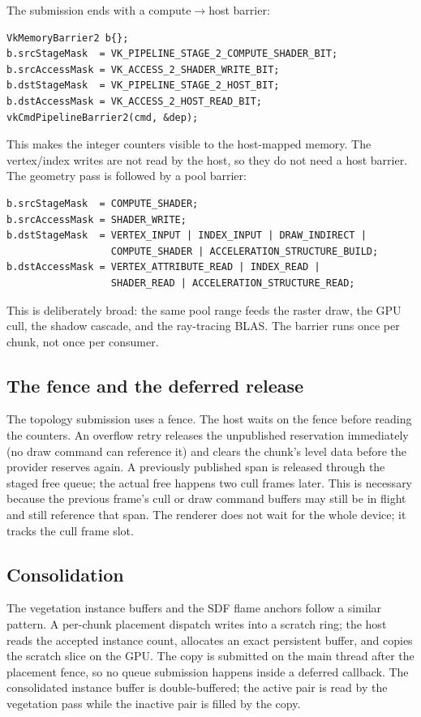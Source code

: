 The submission ends with a compute$\rightarrow$host barrier:
\begin{lstlisting}[style=glsl,caption={Counter readback barrier.},label={lst:hostbarrier}]
VkMemoryBarrier2 b{};
b.srcStageMask  = VK_PIPELINE_STAGE_2_COMPUTE_SHADER_BIT;
b.srcAccessMask = VK_ACCESS_2_SHADER_WRITE_BIT;
b.dstStageMask  = VK_PIPELINE_STAGE_2_HOST_BIT;
b.dstAccessMask = VK_ACCESS_2_HOST_READ_BIT;
vkCmdPipelineBarrier2(cmd, &dep);
\end{lstlisting}
This makes the integer counters visible to the host-mapped memory.  The
vertex/index writes are not read by the host, so they do not need a host
barrier.  The geometry pass is followed by a pool barrier:
\begin{lstlisting}[style=glsl,caption={Pool visibility barrier.},label={lst:poolbarrier}]
b.srcStageMask  = COMPUTE_SHADER;
b.srcAccessMask = SHADER_WRITE;
b.dstStageMask  = VERTEX_INPUT | INDEX_INPUT | DRAW_INDIRECT |
                  COMPUTE_SHADER | ACCELERATION_STRUCTURE_BUILD;
b.dstAccessMask = VERTEX_ATTRIBUTE_READ | INDEX_READ |
                  SHADER_READ | ACCELERATION_STRUCTURE_READ;
\end{lstlisting}
This is deliberately broad: the same pool range feeds the raster draw, the
GPU cull, the shadow cascade, and the ray-tracing BLAS.  The barrier runs
once per chunk, not once per consumer.

\subsection{The fence and the deferred release}

The topology submission uses a fence.  The host waits on the fence before
reading the counters.  An overflow retry releases the unpublished
reservation immediately (no draw command can reference it) and clears the
chunk's level data before the provider reserves again.  A previously
published span is released through the staged free queue; the actual free
happens two cull frames later.  This is necessary because the previous
frame's cull or draw command buffers may still be in flight and still
reference that span.  The renderer does not wait for the whole device; it
tracks the cull frame slot.

\subsection{Consolidation}

The vegetation instance buffers and the SDF flame anchors follow a similar
pattern.  A per-chunk placement dispatch writes into a scratch ring; the
host reads the accepted instance count, allocates an exact persistent
buffer, and copies the scratch slice on the GPU.  The copy is submitted on
the main thread after the placement fence, so no queue submission happens
inside a deferred callback.  The consolidated instance buffer is
double-buffered; the active pair is read by the vegetation pass while the
inactive pair is filled by the copy.

